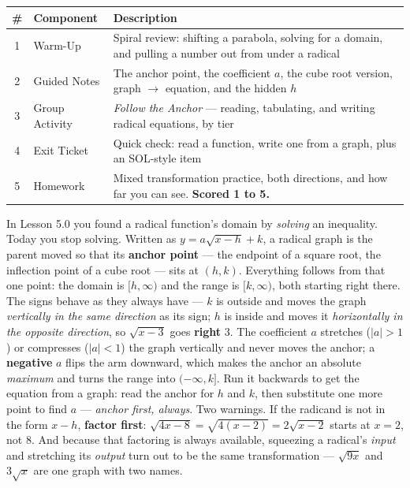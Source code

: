 \documentclass[10pt]{article}
\begin{document}
\begin{tocbox}
\small
\renewcommand{\arraystretch}{1.5}
\begin{tabularx}{\linewidth}{@{} c l X @{}}
\rowcolor{forestbg}
\textbf{\#} & \textbf{Component} & \textbf{Description} \\
\midrule
1 & Warm-Up        & Spiral review: shifting a parabola, solving for a domain, and pulling a number out from under a radical \\
2 & Guided Notes   & The anchor point, the coefficient $a$, the cube root version, graph $\rightarrow$ equation, and the hidden $h$ \\
3 & Group Activity & \emph{Follow the Anchor} --- reading, tabulating, and writing radical equations, by tier \\
4 & Exit Ticket    & Quick check: read a function, write one from a graph, plus an SOL-style item \\
5 & Homework       & Mixed transformation practice, both directions, and how far you can see. \textbf{Scored 1 to 5.} \\
\end{tabularx}
\end{tocbox}

\vspace{0.10in}

\begin{remindbox}
\small In Lesson 5.0 you found a radical function's domain by \emph{solving} an inequality. Today you
stop solving. Written as $y=a\sqrt{x-h}+k$, a radical graph is the parent moved so that its
\textbf{anchor point} --- the endpoint of a square root, the inflection point of a cube root --- sits
at $(h,k)$. Everything follows from that one point: the domain is $[h,\infty)$ and the range is
$[k,\infty)$, both starting right there. The signs behave as they always have --- $k$ is outside and
moves the graph \emph{vertically in the same direction} as its sign; $h$ is inside and moves it
\emph{horizontally in the opposite direction}, so $\sqrt{x-3}$ goes \textbf{right} $3$. The
coefficient $a$ stretches ($|a|>1$) or compresses ($|a|<1$) the graph vertically and never moves the
anchor; a \textbf{negative} $a$ flips the arm downward, which makes the anchor an absolute
\emph{maximum} and turns the range into $(-\infty,k]$. Run it backwards to get the equation from a
graph: read the anchor for $h$ and $k$, then substitute one more point to find $a$ --- \emph{anchor
first, always}. Two warnings. If the radicand is not in the form $x-h$, \textbf{factor first}:
$\sqrt{4x-8}=\sqrt{4(x-2)}=2\sqrt{x-2}$ starts at $x=2$, not $8$. And because that factoring is
always available, squeezing a radical's \emph{input} and stretching its \emph{output} turn out to be
the same transformation --- $\sqrt{9x}$ and $3\sqrt{x}$ are one graph with two names.
\end{remindbox}
\end{document}
